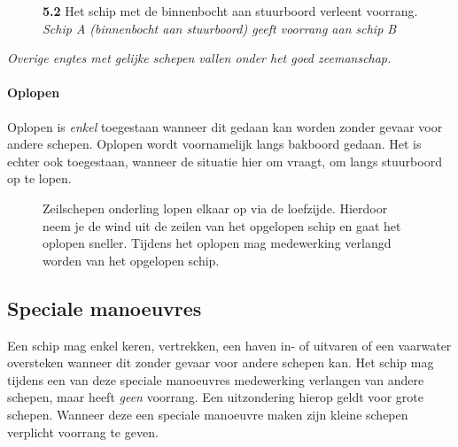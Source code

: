 \vspace{-0.7cm}

\begin{figure}[H]
	\centering
	\hspace{0.02\textwidth}
	\begin{minipage}[t]{0.70\textwidth}
		\textbf{5.2} Het schip met de binnenbocht aan stuurboord verleent voorrang.\\
		\textit{Schip A (binnenbocht aan stuurboord) geeft voorrang aan schip B}
	\end{minipage}
	\hfill
	\begin{minipage}[t]{0.25\textwidth}
		\label{pic:engte:10}
	\end{minipage}
	\hfill
\end{figure}
\vspace{-0.6cm}
\textit{Overige engtes met gelijke schepen vallen onder het goed zeemanschap.}

\paragraph{Oplopen}
Oplopen is \textit{enkel} toegestaan wanneer dit gedaan kan worden zonder gevaar voor andere schepen. Oplopen wordt voornamelijk langs bakboord gedaan. Het is echter ook toegestaan, wanneer de situatie hier om vraagt, om langs stuurboord op te lopen.



\begin{figure}[H]
	\centering
	\begin{minipage}[t]{0.70\textwidth}
	Zeilschepen onderling lopen elkaar op via de loefzijde. Hierdoor neem je de wind uit de zeilen van het opgelopen schip en gaat het oplopen sneller. Tijdens het oplopen mag medewerking verlangd worden van het opgelopen schip.
	\end{minipage}
	\hfill
	\begin{minipage}[t]{0.25\textwidth}
		\label{pic:op}
	\end{minipage}
	\hfill
\end{figure}

\subsection{Speciale manoeuvres}
Een schip mag enkel keren, vertrekken, een haven in- of uitvaren of een vaarwater oversteken wanneer dit zonder gevaar voor andere schepen kan. Het schip mag tijdens een van deze speciale manoeuvres medewerking verlangen van andere schepen, maar heeft \textit{geen} voorrang. Een uitzondering hierop geldt voor grote schepen. Wanneer deze een speciale manoeuvre maken zijn kleine schepen verplicht voorrang te geven.

